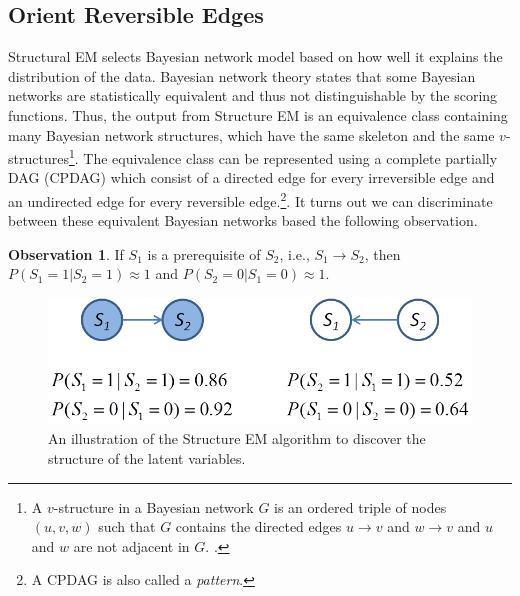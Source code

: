 \documentclass{edm_template}
\begin{document}
\subsection{Orient Reversible Edges}

Structural EM selects Bayesian network model based on how well it explains the distribution of the data. 
Bayesian network theory states that some Bayesian networks are statistically equivalent and thus not distinguishable by the scoring functions.
Thus, the output from Structure EM is an equivalence class containing many Bayesian network structures, which have the same skeleton and the same $v$-structures\footnote{
A $v$-structure in a Bayesian network $G$ is an ordered triple of nodes $(u,v,w)$ such that $G$ contains the directed edges $u\rightarrow v$ and $w\rightarrow v$ and $u$ and $w$ are not adjacent in $G$. \cite{verma1990equivalence}.}. The equivalence class can be represented using a complete partially DAG (CPDAG) which consist of a directed edge for every irreversible edge and an undirected edge for every reversible edge.\footnote{A CPDAG is also called a \emph{pattern}.}.
It turns out we can discriminate between these equivalent Bayesian networks based the following observation.

\textbf{Observation 1}. If $S_1$ is a prerequisite of $S_2$, i.e., $S_1\rightarrow S_2$, then $P(S_1=1|S_2=1)\approx 1$ and $P(S_2=0|S_1=0)\approx 1$.


\begin{figure}[!ht]
	\begin{center}
		\includegraphics[width=0.8\linewidth]{figures/orientedgeexample.png}
	\end{center}
	\caption{\small An illustration of the Structure EM algorithm to discover the structure of the latent variables.}
	\label{fig:orientededgeexample} 
\end{figure} 
\end{document}
